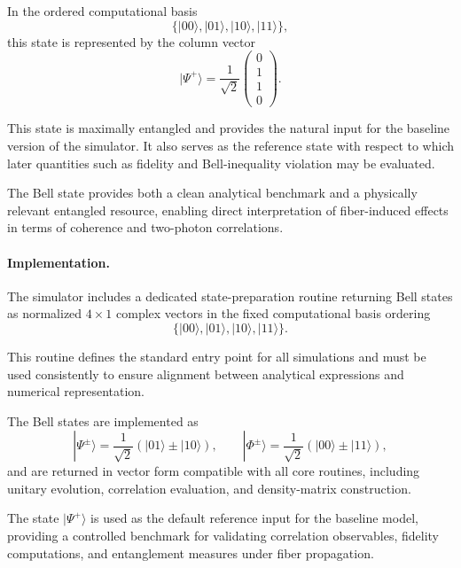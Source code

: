 \documentclass[a4paper]{article}
\begin{document}
In the ordered computational basis
\[
\{|00\rangle, |01\rangle, |10\rangle, |11\rangle\},
\]
this state is represented by the column vector
\[
|\Psi^{+}\rangle
=
\frac{1}{\sqrt{2}}
\begin{pmatrix}
0\\
1\\
1\\
0
\end{pmatrix}.
\]

\medskip

This state is maximally entangled and provides the natural input for the baseline version of the simulator. It also serves as the reference state with respect to which later quantities such as fidelity and Bell-inequality violation may be evaluated.

The Bell state provides both a clean analytical benchmark and a physically relevant entangled resource, enabling direct interpretation of fiber-induced effects in terms of coherence and two-photon correlations.

\medskip

\paragraph{Implementation.}

The simulator includes a dedicated state-preparation routine returning Bell states as normalized \(4 \times 1\) complex vectors in the fixed computational basis ordering
\[
\{|00\rangle, |01\rangle, |10\rangle, |11\rangle\}.
\]

This routine defines the standard entry point for all simulations and must be used consistently to ensure alignment between analytical expressions and numerical representation.

The Bell states are implemented as
\[
|\Psi^{\pm}\rangle
=
\frac{1}{\sqrt{2}}\left(|01\rangle \pm |10\rangle\right),
\qquad
|\Phi^{\pm}\rangle
=
\frac{1}{\sqrt{2}}\left(|00\rangle \pm |11\rangle\right),
\]
and are returned in vector form compatible with all core routines, including unitary evolution, correlation evaluation, and density-matrix construction.

The state \( |\Psi^+\rangle \) is used as the default reference input for the baseline model, providing a controlled benchmark for validating correlation observables, fidelity computations, and entanglement measures under fiber propagation.

\end{document}
